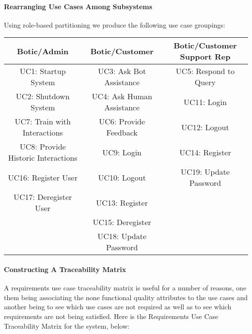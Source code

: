 \documentclass[11pt]{article}
\begin{document}
\paragraph{Rearranging Use Cases Among Subsystems}

Using role-based partitioning we produce the following use case groupings:

\begin{center}
	\begin{tabular}{|c|c|c|}
	\hline
	Botic/Admin & Botic/Customer & Botic/Customer Support Rep \\
	\hline
	UC1: Startup System & UC3: Ask Bot Assistance & UC5: Respond to Query \\
	\hline
	UC2: Shutdown System & UC4: Ask Human Assistance & UC11: Login\\
	\hline
	UC7: Train with Interactions & UC6: Provide Feedback & UC12: Logout\\
	\hline
	UC8: Provide Historic Interactions & UC9: Login & UC14: Register  \\
	\hline
	UC16: Register User & UC10: Logout & UC19: Update Password \\
	\hline
	UC17: Deregister User & UC13: Register &  \\
	\hline
	 & UC15: Deregister & \\
	\hline
	 & UC18: Update Password & \\
	\hline
	\end{tabular}
\end{center}

\paragraph{Constructing A Traceability Matrix}

A requirements use case traceability matrix is useful for a number of reasons, one them being associating the none functional quality attributes to the use cases and another being to see which use cases are not required as well as to see which requirements are not being satisfied. Here is the Requirements Use Case Traceability Matrix for the system, below:
\end{document}
